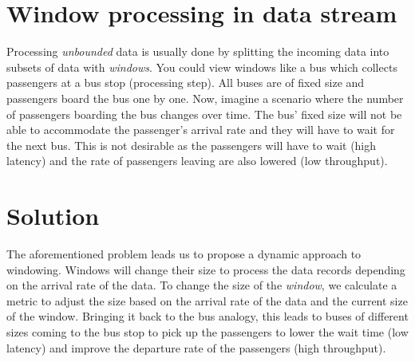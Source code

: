 \section*{Window processing in data stream}

Processing \emph{unbounded} data is usually done by splitting the 
incoming data into subsets of data with \emph{windows}. You could view
windows like a bus which collects passengers at a 
bus stop (processing step). All buses are of fixed size and passengers board
the bus one by one. Now, imagine a scenario where the number of passengers
boarding the bus changes over time. The bus' fixed size will not be able 
to accommodate the passenger's arrival rate and they will have to wait for the
next bus. This is not desirable as the passengers will have 
to wait (high latency) 
and the rate of passengers leaving are also lowered (low throughput).


\section*{Solution}
The aforementioned problem leads us to propose a dynamic approach 
to windowing. Windows will change their size to process the data 
records depending on the arrival rate of the data. 
To change the size of the \emph{window}, we calculate a metric 
to adjust the size based on the arrival rate of the data and the 
current size of the window. Bringing it back to the bus analogy, 
this leads to buses of different sizes coming to the bus stop to 
pick up the passengers to lower the wait time (low latency) and 
improve the departure rate of the passengers (high throughput). 
